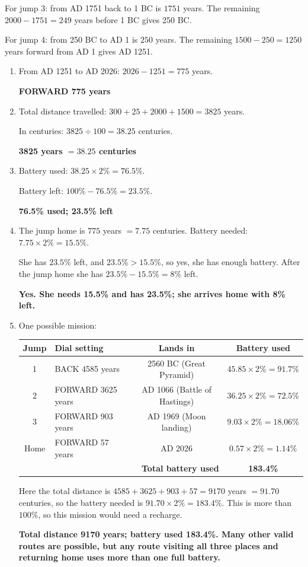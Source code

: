 \documentclass[11pt,a4paper]{article}
\newcommand{\ans}[1]{\textcolor{ttaccent}{\bfseries #1}}
\begin{document}
For jump 3: from AD 1751 back to 1 BC is $1751$ years. The remaining $2000-1751=249$ years before 1 BC gives 250 BC.

For jump 4: from 250 BC to AD 1 is $250$ years. The remaining $1500-250=1250$ years forward from AD 1 gives AD 1251.

\begin{enumerate}[label=\textbf{\arabic*.}, leftmargin=*, itemsep=6pt]
\item From AD 1251 to AD 2026:
$2026-1251=775$ years.

\ans{FORWARD 775 years}

\item Total distance travelled:
$300+25+2000+1500=3825$ years.

In centuries:
$3825\div100=38.25$ centuries.

\ans{3825 years $=38.25$ centuries}

\item Battery used:
$38.25\times2\%=76.5\%$.

Battery left:
$100\%-76.5\%=23.5\%$.

\ans{76.5\% used; 23.5\% left}

\item The jump home is $775$ years $=7.75$ centuries.
Battery needed:
$7.75\times2\%=15.5\%$.

She has $23.5\%$ left, and $23.5\%>15.5\%$, so yes, she has enough battery. After the jump home she has
$23.5\%-15.5\%=8\%$ left.

\ans{Yes. She needs 15.5\% and has 23.5\%; she arrives home with 8\% left.}

\item One possible mission:
\begin{center}
\begin{tabular}{c|l|c|c}
\toprule
Jump & Dial setting & Lands in & Battery used\\
\midrule
1 & BACK 4585 years & 2560 BC (Great Pyramid) & $45.85\times2\%=91.7\%$\\
2 & FORWARD 3625 years & AD 1066 (Battle of Hastings) & $36.25\times2\%=72.5\%$\\
3 & FORWARD 903 years & AD 1969 (Moon landing) & $9.03\times2\%=18.06\%$\\
Home & FORWARD 57 years & AD 2026 & $0.57\times2\%=1.14\%$\\
\midrule
\multicolumn{3}{r}{\textbf{Total battery used}} & \ans{183.4\%}\\
\bottomrule
\end{tabular}
\end{center}

Here the total distance is
$4585+3625+903+57=9170$ years $=91.70$ centuries, so the battery needed is
$91.70\times2\%=183.4\%$. This is more than $100\%$, so this mission would need a recharge.

\ans{Total distance 9170 years; battery used 183.4\%. Many other valid routes are possible, but any route visiting all three places and returning home uses more than one full battery.}
\end{enumerate}
\end{document}
